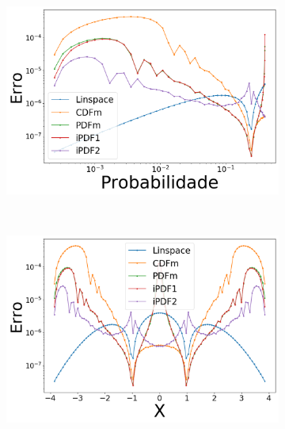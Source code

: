 \begin{figure}[H]
	\centering
	\begin{subfigure}[b]{0.45\textwidth}
		\centering 
		\includegraphics[width=\textwidth]{./figuras/error_normal_linear_Probabilidade_1}
		\caption{}
		\label{fig:11a}
	\end{subfigure}
	\hfill
	~ %
	\begin{subfigure}[b]{0.45\textwidth}
		\centering 
		\includegraphics[width=\textwidth]{./figuras/error_normal_linear_X_1}
		\caption{}
		\label{fig:11b}
	\end{subfigure}
	~ %

\end{figure}
